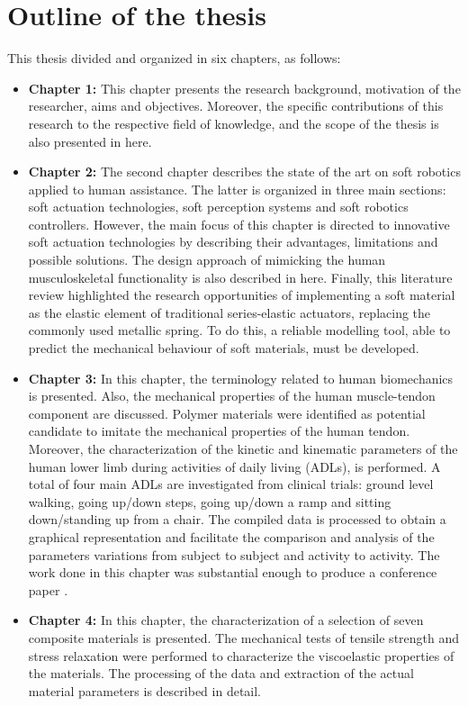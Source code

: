 \section{Outline of the thesis}

This thesis divided and organized in six chapters, as follows:
\begin{itemize}
    \item {\bf Chapter 1: } This chapter presents the research background, motivation of the researcher, aims and objectives. Moreover, the specific contributions of this research to the respective field of knowledge, and the scope of the thesis is also presented in here.
    \item {\bf Chapter 2:} The second chapter describes the state of the art on soft robotics applied to human assistance. The latter is organized in three main sections: soft actuation technologies, soft perception systems and soft robotics controllers. However, the main focus of this chapter is directed to innovative soft actuation technologies by describing their advantages, limitations and possible solutions. The design approach of mimicking the human musculoskeletal functionality is also described in here.  Finally, this literature review highlighted the research opportunities of implementing a soft material as the elastic element of traditional series-elastic actuators, replacing the commonly used metallic spring. To do this, a reliable modelling tool, able to predict the mechanical behaviour of soft materials, must be developed.
    \item {\bf Chapter 3:} In this chapter, the terminology related to human biomechanics is presented. Also, the mechanical properties of the human muscle-tendon component are discussed. Polymer materials were identified as potential candidate to imitate the mechanical properties of the human tendon. Moreover, the characterization of the kinetic and kinematic parameters of the human lower limb during activities of daily living (ADLs), is performed. A total of four main ADLs are investigated from clinical trials: ground level walking, going up/down steps, going up/down a ramp and sitting down/standing up from a chair. The compiled data is processed to obtain a graphical representation and facilitate the comparison and analysis of the parameters variations from subject to subject and activity to activity. The work done in this chapter was substantial enough to produce a conference paper \cite{solis2017characterization}.
    \item {\bf Chapter 4: } In this chapter, the characterization of a selection of seven composite materials is presented. The mechanical tests of tensile strength and stress relaxation were performed to characterize the viscoelastic properties of the materials. The processing of the data and extraction of the actual material parameters is described in detail.

\end{itemize}
